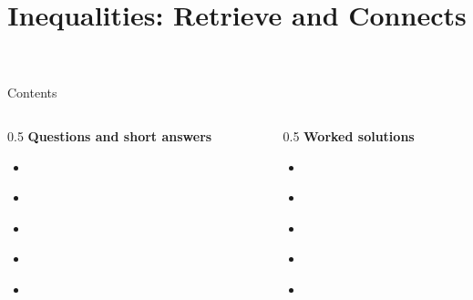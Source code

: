 \documentclass{beamer}
\title{Inequalities: Retrieve and Connects}
\author{}
\date{}
\begin{document}
\frame{\titlepage}

\begin{frame}{Contents}
\small
\begin{columns}[T]
\begin{column}{0.5\textwidth}
\textbf{Questions and short answers}
\begin{itemize}
\item \hyperlink{q-st1}{}
\item \hyperlink{q-st2}{}
\item \hyperlink{q-st3}{}
\item \hyperlink{q-st4}{}
\item \hyperlink{q-st5}{}
\end{itemize}
\end{column}
\begin{column}{0.5\textwidth}
\textbf{Worked solutions}
\begin{itemize}
\item \hyperlink{work-st1}{}
\item \hyperlink{work-st2}{}
\item \hyperlink{work-st3}{}
\item \hyperlink{work-st4}{}
\item \hyperlink{work-st5}{}
\end{itemize}
\end{column}
\end{columns}
\end{frame}
\end{document}
